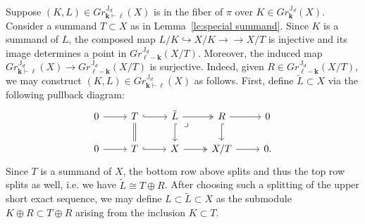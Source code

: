 \documentclass{amsart}
\numberwithin{equation}{section}
\theoremstyle{definition}
\def\JJ{\mathbb{J}}
\def\bfk{\mathbf{k}}
\def\bfl{{\ensuremath{\boldsymbol\ell}}}
\newcommand{\partition}{\vdash}
\newcommand{\into}{\hookrightarrow}
\newcommand{\onto}{\to\!\!\!\!\!\to}
\begin{document}
Suppose $(K,L)\in Gr^{\JJ_d}_{\bfk\partition\bfl}(X)$ is in the fiber of $\pi$ over $K\in Gr^{\JJ_d}_\bfk(X)$.  Consider a summand $T\subset X$ as in Lemma~\ref{le:special summand}.  Since $K$ is a summand of $L$, the composed map $L/K\into X/K\onto X/T$ is injective and its image determines a point in $Gr^{\JJ_d}_{\bfl-\bfk}(X/T)$.  Moreover, the induced map $Gr^{\JJ_d}_{\bfk\partition\bfl}(X)\to Gr^{\JJ_d}_{\bfl-\bfk}(X/T)$ is surjective.  Indeed, given $R\in Gr^{\JJ_d}_{\bfl-\bfk}(X/T)$, we may construct $(K,L)\in Gr^{\JJ_d}_{\bfk\partition\bfl}(X)$ as follows.  First, define $\tilde L\subset X$ via the following pullback diagram:
\[\begin{tikzcd}
  0 \arrow{r} & T\arrow[hook]{r}\arrow[equal]{d} & \tilde L\arrow[two heads]{r}\arrow[hook]{d}\arrow[dr, phantom, "\lrcorner", very near start]& R\arrow{r}\arrow[hook]{d} & 0 \\
  0 \arrow{r} & T\arrow[hook]{r} & X\arrow[two heads]{r} & X/T\arrow{r} & 0.
\end{tikzcd}\]
Since $T$ is a summand of $X$, the bottom row above splits and thus the top row splits as well, i.e. we have $\tilde L\cong T\oplus R$.  After choosing such a splitting of the upper short exact sequence, we may define $L\subset\tilde L\subset X$ as the submodule $K\oplus R\subset T\oplus R$ arising from the inclusion $K\subset T$.
\end{document}
